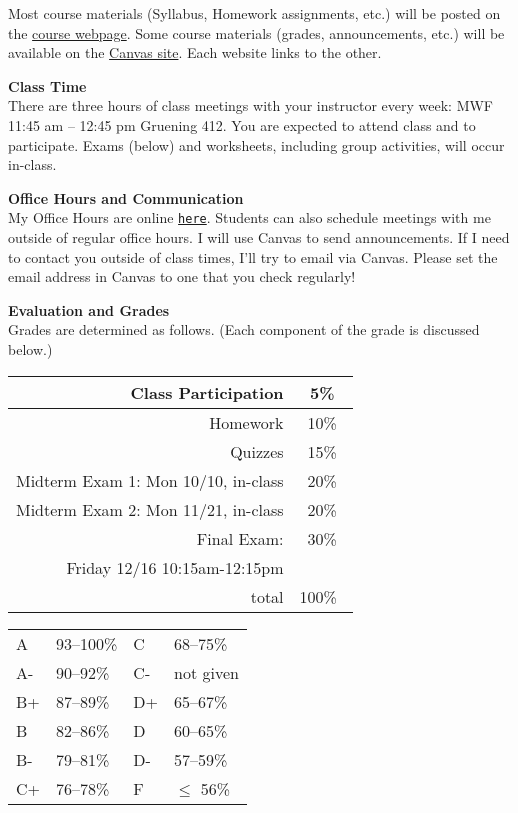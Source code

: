 \documentclass[12pt]{article}
\renewcommand{\emph}[1]{\textsf{\textbf{#1}}}
\newcommand{\localhead}[1]{\par\smallskip\textbf{#1} \smallskip\nobreak\\}%
\def\heading#1{\localhead{\large\emph{#1}}}
\begin{document}
Most course materials (Syllabus, Homework assignments, etc.) will be posted on the \href{https://jrfaudree.github.io/M314f2022/home.html}{course webpage}.  Some course materials (grades, announcements, etc.) will be available on the \href{https://canvas.alaska.edu}{Canvas site}.  Each website links to the other.


\heading{Class Time}
There are three hours of class meetings with your instructor every week: MWF 11:45 am -- 12:45 pm  Gruening 412.  You are expected to attend class and to participate.  Exams (below) and worksheets, including group activities, will occur in-class.



\heading{Office Hours and Communication}
My Office Hours are online \href{https://docs.google.com/spreadsheets/d/e/2PACX-1vQ76z4RI6jhESlbN8vvxmtcY1rqmVvdfQmD433K4WA0a4Kyn_7lcYq68mq9tO0swUYd54hZedaHQuSP/pubhtml?gid=0&single=true}{\texttt{here}}.  Students can also schedule meetings with me outside of regular office hours.  I will use Canvas to send announcements.  If I need to contact you outside of class times, I'll try to email via Canvas.  Please set the email address in Canvas to one that you check regularly!


\heading{Evaluation and Grades}
Grades are determined as follows.  (Each component of the grade is discussed below.)

\begin{multicols}{2}
\begin{tabular}{|r|c|}
\hline
Class Participation& 5\%\\ \hline
Homework & 10\% \\  \hline
Quizzes & 15\%\\
\hline
Midterm Exam 1: Mon 10/10, in-class & 20\% \\
\hline
Midterm Exam 2: Mon 11/21, in-class & 20\%  \\
\hline
Final Exam: & 30\% \\
{Friday 12/16} 10:15am-12:15pm&\\
\hline
total & 100\% \, \\
\hline
\end{tabular}

\begin{tabular}{llll}
A  & 93--100\%& C  & 68--75\%  \\
A- & 90--92\% & C- & not given \\
B+ & 87--89\% & D+ & 65--67\%  \\
B  & 82--86\% & D  & 60--65\%  \\
B- & 79--81\% & D- & 57--59\%  \\
C+ & 76--78\% & F  & $\le$ 56\%
\end{tabular}
\end{multicols}
\end{document}
